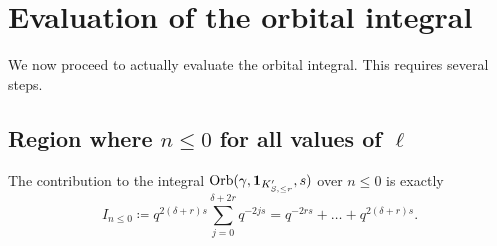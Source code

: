 \chapter{Evaluation of the orbital integral}
We now proceed to actually evaluate the orbital integral.
This requires several steps.

\section{Region where $n \leq 0$ for all values of $\ell$}
\begin{proposition}
  The contribution to the integral $\operatorname{Orb}(\gamma, \mathbf{1}_{K'_{S, \le r}}, s)$ over $n \leq 0$ is exactly
  \[ I_{n \le 0} \coloneqq q^{2(\delta+r)s} \sum_{j=0}^{\delta+2r} q^{-2js}
    = q^{-2rs} + \dots + q^{2(\delta+r)s}. \]
\end{proposition}
